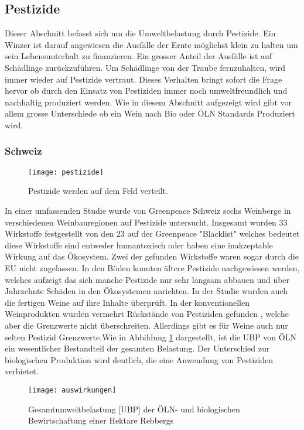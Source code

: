 \subsection{Pestizide}
Dieser Abschnitt befasst sich um die Umweltbelastung durch Pestizide. Ein Winzer ist darauf angewiesen die Ausfälle der Ernte möglichst klein zu halten um sein Lebensunterhalt zu finanzieren. Ein grosser Anteil der Ausfälle ist auf Schädlinge zurückzuführen. Um Schädlinge von der Traube fernzuhalten, wird immer wieder auf Pestizide vertraut. Dieses Verhalten bringt sofort die Frage hervor ob durch den Einsatz von Pestiziden immer noch umweltfreundlich und nachhaltig produziert werden. Wie in diesem Abschnitt aufgezeigt wird gibt vor allem grosse Unterschiede ob ein Wein nach Bio oder ÖLN Standards Produziert wird.
\subsubsection{Schweiz}
\begin{wrapfigure}{r}{10cm}
	\texttt{[image: pestizide]}
	\caption{Pestizide werden auf dem Feld verteilt.}
\end{wrapfigure}
In einer umfassenden Studie\cite{_reportweintesting-1.pdf} wurde von Greenpeace Schweiz sechs Weinberge in verschiedenen Weinbauregionen auf Pestizide untersucht. Insgesamt wurden 33 Wirkstoffe festgestellt von den 23 auf der Greenpeace "Blacklist" welches bedeutet diese Wirkstoffe sind entweder humantoxisch oder haben eine inakzeptable Wirkung auf das Ökosystem. Zwei der gefunden Wirkstoffe waren sogar durch die EU nicht zugelassen. In den Böden konnten ältere Pestizide nachgewiesen werden, welches aufzeigt das sich manche Pestizide nur sehr langsam abbauen und über Jahrzehnte Schäden in den Ökosystemen anrichten. In der Studie wurden auch die fertigen Weine auf ihre Inhalte überprüft. In der konventionellen Weinprodukten wurden vermehrt Rückstände von Pestiziden gefunden , welche aber die Grenzwerte nicht überschreiten. Allerdings gibt es für Weine auch nur selten Pestizid Grenzwerte.Wie in Abbildung \ref{fig:ha} dargestellt, ist die UBP von ÖLN ein wesentlicher Bestandteil der gesamten Belastung. Der Unterschied zur biologischen Produktion wird deutlich, die eine Anwendung von Pestiziden verbietet.
 \begin{figure}[H]	
	\centering
	\texttt{[image: auswirkungen]}
	\caption{Gesamtumweltbelastung [UBP] der ÖLN- und biologischen Bewirtschaftung einer Hektare Rebbergs}
	\label{fig:ha}
\end{figure}

